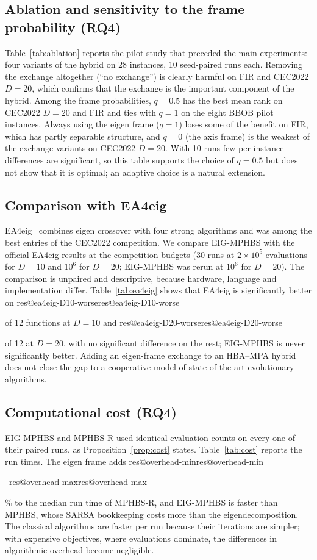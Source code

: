 \documentclass[preprint,12pt,authoryear]{elsarticle}
\makeatletter
\theoremstyle{remark}
\def\res#1{\ifcsname res@#1\endcsname\csname res@#1\endcsname\else\PackageError{res}{Undefined result key #1}{}\fi}
\makeatother
\begin{document}
\subsection{Ablation and sensitivity to the frame probability (RQ4)}
\label{sec:ablation}
Table~\ref{tab:ablation} reports the pilot study that preceded the main experiments: four variants of the hybrid on 28
instances, 10 seed-paired runs each. Removing the exchange altogether (``no exchange'') is clearly harmful on FIR and
CEC2022 $D=20$, which confirms that the exchange is the important component of the hybrid. Among the frame
probabilities, $q=0.5$ has the best mean rank on CEC2022 $D=20$ and FIR and ties with $q=1$ on the eight BBOB pilot
instances. Always using the eigen frame ($q=1$) loses some of the benefit on FIR, which has partly separable structure,
and $q=0$ (the axis frame) is the weakest of the exchange variants on CEC2022 $D=20$. With 10 runs few per-instance
differences are significant, so this table supports the choice of $q=0.5$ but does not show that it is optimal; an
adaptive choice is a natural extension.



\subsection{Comparison with EA4eig}
EA4eig~\citep{bujok2022ea4eig} combines eigen crossover with four strong algorithms and was among the best entries of
the CEC2022 competition. We compare EIG-MPHBS with the official EA4eig results at the competition budgets (30 runs at
$2\times10^5$ evaluations for $D=10$ and $10^6$ for $D=20$; EIG-MPHBS was rerun at $10^6$ for $D=20$). The comparison is
unpaired and descriptive, because hardware, language and implementation differ. Table~\ref{tab:ea4eig} shows that EA4eig
is significantly better on \res{ea4eig-D10-worse} of 12 functions at $D=10$ and \res{ea4eig-D20-worse} of 12 at $D=20$,
with no significant difference on the rest; EIG-MPHBS is never significantly better. Adding an eigen-frame exchange to
an HBA--MPA hybrid does not close the gap to a cooperative model of state-of-the-art evolutionary algorithms.



\subsection{Computational cost (RQ4)}
\label{sec:cost}
EIG-MPHBS and MPHBS-R used identical evaluation counts on every one of their paired runs, as
Proposition~\ref{prop:cost} states. Table~\ref{tab:cost} reports the run times. The eigen frame adds
\res{overhead-min}--\res{overhead-max}\% to the median run time of MPHBS-R, and EIG-MPHBS is faster than MPHBS, whose
SARSA bookkeeping costs more than the eigendecomposition. The classical algorithms are faster per run because their
iterations are simpler; with expensive objectives, where evaluations dominate, the differences in algorithmic overhead
become negligible.
\end{document}
